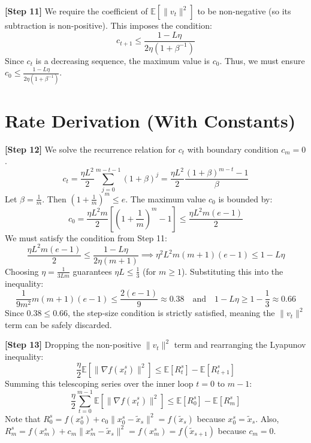 \documentclass[11pt]{article}
\begin{document}
\textbf{[Step 11]} We require the coefficient of $\mathbb{E}[\|v_t\|^2]$ to be non-negative (so its subtraction is non-positive). This imposes the condition:
\begin{equation} \tag{Step 11}
    c_{t+1} \le \frac{1 - L\eta}{2\eta(1 + \beta^{-1})}
\end{equation}
Since $c_t$ is a decreasing sequence, the maximum value is $c_0$. Thus, we must ensure $c_0 \le \frac{1 - L\eta}{2\eta(1 + \beta^{-1})}$.

\section*{Rate Derivation (With Constants)}

\textbf{[Step 12]} We solve the recurrence relation for $c_t$ with boundary condition $c_m = 0$.
\begin{equation*}
    c_t = \frac{\eta L^2}{2} \sum_{j=0}^{m-t-1} (1+\beta)^j = \frac{\eta L^2}{2} \frac{(1+\beta)^{m-t} - 1}{\beta}
\end{equation*}
Let $\beta = \frac{1}{m}$. Then $(1+\frac{1}{m})^m \le e$. The maximum value $c_0$ is bounded by:
\begin{equation*}
    c_0 = \frac{\eta L^2 m}{2} \left[ \left(1+\frac{1}{m}\right)^m - 1 \right] \le \frac{\eta L^2 m (e-1)}{2}
\end{equation*}
We must satisfy the condition from Step 11:
\begin{equation*}
    \frac{\eta L^2 m (e-1)}{2} \le \frac{1 - L\eta}{2\eta(m + 1)} \implies \eta^2 L^2 m(m+1)(e-1) \le 1 - L\eta
\end{equation*}
Choosing $\eta = \frac{1}{3Lm}$ guarantees $\eta L \le \frac{1}{3}$ (for $m \ge 1$). Substituting this into the inequality:
\begin{equation} \tag{Step 12}
    \frac{1}{9m^2} m(m+1)(e-1) \le \frac{2(e-1)}{9} \approx 0.38 \quad \text{and} \quad 1 - L\eta \ge 1 - \frac{1}{3} \approx 0.66
\end{equation}
Since $0.38 \le 0.66$, the step-size condition is strictly satisfied, meaning the $\|v_t\|^2$ term can be safely discarded.

\textbf{[Step 13]} Dropping the non-positive $\|v_t\|^2$ term and rearranging the Lyapunov inequality:
\begin{equation} \tag{Step 13}
    \frac{\eta}{2} \mathbb{E}[\|\nabla f(x_t^s)\|^2] \le \mathbb{E}[R_t^s] - \mathbb{E}[R_{t+1}^s]
\end{equation}
Summing this telescoping series over the inner loop $t = 0$ to $m-1$:
\begin{equation*}
    \frac{\eta}{2} \sum_{t=0}^{m-1} \mathbb{E}[\|\nabla f(x_t^s)\|^2] \le \mathbb{E}[R_0^s] - \mathbb{E}[R_m^s]
\end{equation*}
Note that $R_0^s = f(x_0^s) + c_0\|x_0^s - \tilde{x}_s\|^2 = f(\tilde{x}_s)$ because $x_0^s = \tilde{x}_s$. Also, $R_m^s = f(x_m^s) + c_m\|x_m^s - \tilde{x}_s\|^2 = f(x_m^s) = f(\tilde{x}_{s+1})$ because $c_m = 0$.
\end{document}
